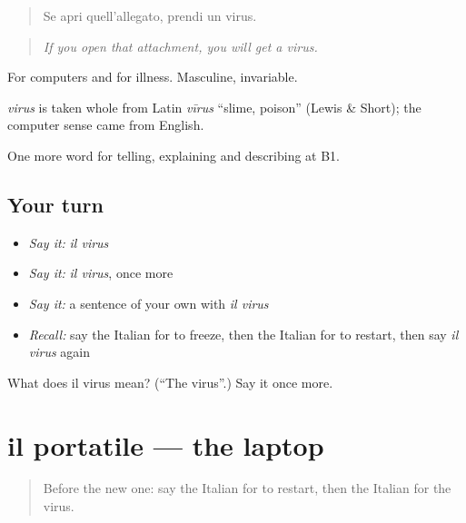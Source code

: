 \begin{quote}
Se apri quell'allegato, prendi un virus.
\end{quote}

\begin{quote}
\emph{If you open that attachment, you will get a virus.}
\end{quote}

For computers and for illness. Masculine, invariable.

\begin{cousinweb}
\emph{virus} is taken whole from Latin \emph{vīrus} \textquotedblleft{}slime, poison\textquotedblright{} (Lewis \& Short); the computer sense came from English.
\end{cousinweb}

\begin{grammarlens}[title={What you've built}]
One more word for telling, explaining and describing at B1.
\end{grammarlens}

\subsection*{Your turn}
\begin{itemize}
\raggedright
  \item \emph{Say it:} \emph{il virus}
  \item \emph{Say it:} \emph{il virus}, once more
  \item \emph{Say it:} a sentence of your own with \emph{il virus}
  \item \emph{Recall:} say the Italian for to freeze, then the Italian for to restart, then say \emph{il virus} again
\end{itemize}

\begin{tcolorbox}[breakable,colback=teal!4,colframe=teal!35!black,title={Before you move on}]
What does il virus mean? (\textquotedblleft{}The virus\textquotedblright{}.) Say it once more.
\end{tcolorbox}
\section[il portatile]{il portatile — the laptop}

\label{lesson:IT-C404-portatile}



\begin{quote}
Before the new one: say the Italian for to restart, then the Italian for the virus.
\end{quote}


